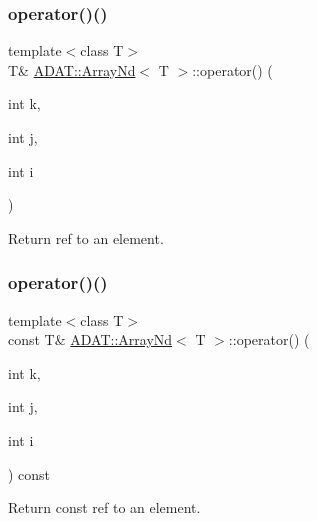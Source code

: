 \subsubsection{\texorpdfstring{operator()()}{operator()()}\hspace{0.1cm}{\footnotesize\ttfamily [15/24]}}
{\footnotesize\ttfamily template$<$class T$>$ \\
T\& \mbox{\hyperlink{classADAT_1_1ArrayNd}{A\+D\+A\+T\+::\+Array\+Nd}}$<$ T $>$\+::operator() (\begin{DoxyParamCaption}\item[{int}]{k,  }\item[{int}]{j,  }\item[{int}]{i }\end{DoxyParamCaption})\hspace{0.3cm}{\ttfamily [inline]}}



Return ref to an element. 

\mbox{\label{classADAT_1_1ArrayNd_a1452ab01ffb2824ebcfa50ebbcdd7b8a}} 
\subsubsection{\texorpdfstring{operator()()}{operator()()}\hspace{0.1cm}{\footnotesize\ttfamily [16/24]}}
{\footnotesize\ttfamily template$<$class T$>$ \\
const T\& \mbox{\hyperlink{classADAT_1_1ArrayNd}{A\+D\+A\+T\+::\+Array\+Nd}}$<$ T $>$\+::operator() (\begin{DoxyParamCaption}\item[{int}]{k,  }\item[{int}]{j,  }\item[{int}]{i }\end{DoxyParamCaption}) const\hspace{0.3cm}{\ttfamily [inline]}}



Return const ref to an element. 

\mbox{\label{classADAT_1_1ArrayNd_a1452ab01ffb2824ebcfa50ebbcdd7b8a}} 
